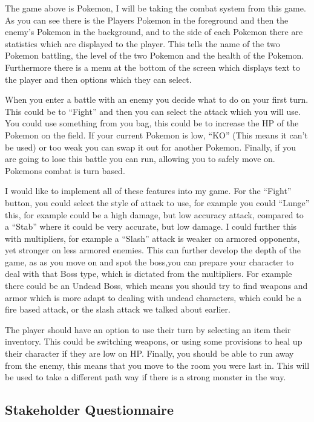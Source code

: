 \documentclass[12pt]{article}
\begin{document}
The game above is Pokemon, I will be taking the combat system from this game. As you can see there is the Players Pokemon in the foreground and then the enemy’s Pokemon in the background, and to the side of each Pokemon there are statistics which are displayed to the player. This tells the name of the two Pokemon battling, the level of the two Pokemon and the health of the Pokemon. Furthermore there is a menu at the bottom of the screen which displays text to the player and then options which they can select. 

When you enter a battle with an enemy you decide what to do on your first turn. This could be to “Fight” and then you can select the attack which you will use. You could use something from you bag, this could be to increase the HP of the Pokemon on the field. If your current Pokemon is low, “KO” (This means it can’t be used) or too weak you can swap it out for another Pokemon. Finally, if you are going to lose this battle you can run, allowing you to safely move on. Pokemons combat is turn based.

I would like to implement all of these features into my game. For the “Fight” button, you could select the style of attack to use, for example you could “Lunge” this, for example could be a high damage, but low accuracy attack, compared to a “Stab” where it could be very accurate, but low damage. I could further this with multipliers, for example a “Slash” attack is weaker on armored opponents, yet stronger on less armored enemies. This can further develop the depth of the game, as as you move on and spot the boss,you can prepare your character to deal with that Boss type, which is dictated from the multipliers. For example there could be an Undead Boss, which means you should try to find weapons and armor which is more adapt to dealing with undead characters, which could be a fire based attack, or the slash attack we talked about earlier.

The player should have an option to use their turn by selecting an item their inventory. This could be switching weapons, or using some provisions to heal up their character if they are low on HP. Finally, you should be able to run away from the enemy, this means that you move to the room you were last in. This will be used to take a different path way if there is a strong monster in the way.
	
		\subsection{Stakeholder Questionnaire}
\end{document}

